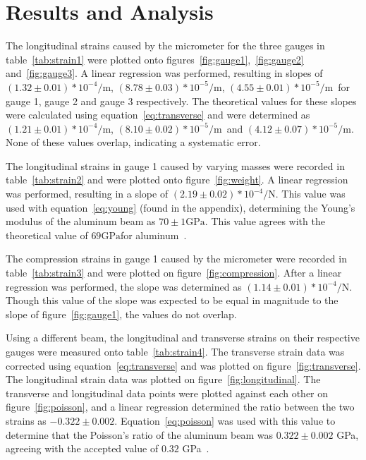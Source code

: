 \documentclass[]{article}
\newcommand{\gaugeOneTheoretical}{\ensuremath{(1.32 \pm 0.01) * 10^{-4}
\si{\per\meter}}}
\newcommand{\gaugeTwoTheoretical}{\ensuremath{(8.78 \pm 0.03) * 10^{-5} \si{\per\meter}}}
\newcommand{\gaugeThreeTheoretical}{\ensuremath{(4.55 \pm 0.01) * 10^{-5} \si{\per\meter}}}
\newcommand{\gaugeOneMeasured}{\ensuremath{(1.21 \pm 0.01) * 10^{-4} \si{\per\meter}}}
\newcommand{\gaugeTwoMeasured}{\ensuremath{(8.10 \pm 0.02) * 10^{-5} \si{\per\meter}}}
\newcommand{\gaugeThreeMeasured}{\ensuremath{(4.12 \pm 0.07) * 10^{-5} \si{\per\meter}}}
\newcommand{\weightSlope}{\ensuremath{(2.19 \pm 0.02) * 10^{-4} \si{\per\newton}}}
\newcommand{\youngsMeasured}{\ensuremath{70 \pm 1 \si{\giga\pascal}}}
\newcommand{\youngsTheoretical}{\ensuremath{69 \si{\giga\pascal}}}
\newcommand{\compressionSlope}{\ensuremath{(1.14 \pm 0.01) * 10^{-4}
\si{\per\newton}}}
\newcommand{\ratio}{\ensuremath{-0.322 \pm 0.002}}
\newcommand{\poissonMeasured}{\ensuremath{0.322 \pm 0.002} \si{\giga\pascal}}
\newcommand{\poissonTheoretical}{\ensuremath{0.32} \si{\giga\pascal}}
\begin{document}
\section{Results and Analysis}
The longitudinal strains caused by the micrometer for the three gauges in
table~\ref{tab:strain1} were plotted onto
figures~\ref{fig:gauge1},~\ref{fig:gauge2} and~\ref{fig:gauge3}. A linear
regression was performed, resulting in slopes of \gaugeOneTheoretical,
\gaugeTwoTheoretical, \gaugeThreeTheoretical\ for gauge 1, gauge 2 and gauge 3
respectively. The theoretical values for these slopes were calculated using
equation~\ref{eq:transverse} and were determined as \gaugeOneMeasured,
\gaugeTwoMeasured\ and \gaugeThreeMeasured. None of these values overlap,
indicating a systematic error.

The longitudinal strains in gauge 1 caused by varying masses were recorded in
table~\ref{tab:strain2} and were plotted onto figure~\ref{fig:weight}. A
linear regression was performed, resulting in a slope of \weightSlope. This
value was used with equation~\ref{eq:young} (found in the appendix), determining the
Young's modulus of the aluminum beam as \youngsMeasured. This value agrees with
the theoretical value of \youngsTheoretical for aluminum~\cite{ref:young}.

The compression strains in gauge 1 caused by the micrometer were
recorded in table~\ref{tab:strain3} and were plotted on
figure~\ref{fig:compression}. After a linear regression was performed, the slope
was determined as \compressionSlope. Though this value of the slope was expected
to be equal in magnitude to the slope of figure~\ref{fig:gauge1}, the values do
not overlap.

Using a different beam, the longitudinal and transverse strains on their
respective gauges were measured onto table~\ref{tab:strain4}. The transverse
strain data was corrected using equation~\ref{eq:transverse} and was plotted on
figure~\ref{fig:transverse}. The longitudinal strain data was plotted on
figure~\ref{fig:longitudinal}. The transverse and longitudinal data points were
plotted against each other on figure~\ref{fig:poisson}, and a linear regression
determined the ratio between the two strains as \ratio.
Equation~\ref{eq:poisson} was used with this value to determine that the
Poisson's ratio of the aluminum beam was \poissonMeasured, agreeing with the
accepted value of \poissonTheoretical~\cite{ref:poisson}.
\end{document}
